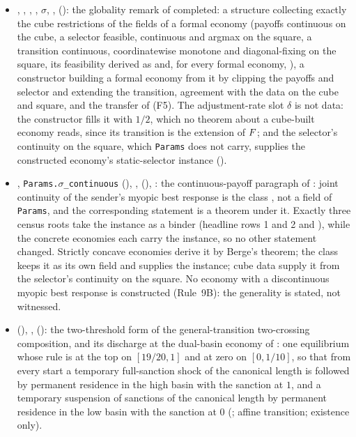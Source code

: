 \begin{itemize}[leftmargin=1.4em,itemsep=1pt]
\item {}, , , , $\sigma$, ,  (): the globality remark of  completed: a structure collecting exactly the cube restrictions of the fields of a formal economy (payoffs continuous on the cube, a selector feasible, continuous and argmax on the square, a transition continuous, coordinatewise monotone and diagonal-fixing on the square, its feasibility derived as  and, for every formal economy, ), a constructor building a formal economy from it by clipping the payoffs and selector and extending the transition, agreement with the data on the cube and square, and the transfer of (F5). The adjustment-rate slot $\delta$ is not data: the constructor fills it with $1/2$, which no theorem about a cube-built economy reads, since its transition is the extension of $F$; and the selector's continuity on the square, which \texttt{Params} does not carry, supplies the constructed economy's static-selector instance ().
\item {}, \texttt{Params.$\sigma$\_continuous} (), ,  (), : the continuous-payoff paragraph of : joint continuity of the sender's myopic best response is the class , not a field of \texttt{Params}, and the corresponding statement is a theorem under it. Exactly three census roots take the instance as a binder (headline rows 1 and 2 and ), while the concrete economies each carry the instance, so no other statement changed. Strictly concave economies derive it by Berge's theorem; the class keeps it as its own field and supplies the instance; cube data supply it from the selector's continuity on the square. No economy with a discontinuous myopic best response is constructed (Rule~9B): the generality is stated, not witnessed.
\item {} (), ,  (): the two-threshold form of the general-transition two-crossing composition, and its discharge at the dual-basin economy of : one equilibrium whose rule is at the top on $[19/20,1]$ and at zero on $[0,1/10]$, so that from every start a temporary full-sanction shock of the canonical length is followed by permanent residence in the high basin with the sanction at $1$, and a temporary suspension of sanctions of the canonical length by permanent residence in the low basin with the sanction at $0$ (; affine transition; existence only).

\end{itemize}
